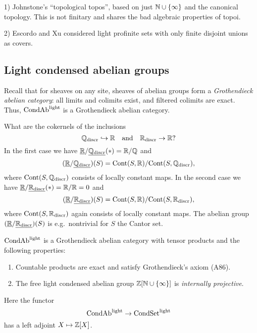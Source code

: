 \documentclass{notes}
\begin{document}
\begin{rem}
1) Johnstone's ``topological topos'', based on just ${\mathbb{N}}\cup\{\infty\}$
and the canonical topology. This is not finitary and shares the bad
algebraic properties of topoi. 

2) Escordo and Xu considered light profinite sets with only finite
disjoint unions as covers. 
\end{rem}

\subsection{Light condensed abelian groups}

Recall that for sheaves on any site, sheaves of abelian groups form a
{\em Grothendieck abelian category}: all limits and colimits exist,
and filtered colimits are exact. 
Thus, $\text{CondAb}^{\rm light}$ is a Grothendieck abelian category. 

\begin{example}
What are the cokernels of the inclusions
$$
  {\mathbb{Q}}_{\rm discr}\hookrightarrow{\mathbb{R}} \quad\text{and}\quad {\mathbb{R}}_{\rm discr}\to {\mathbb{R}}?
$$
In the first case we have $\underline{{\mathbb{R}}}/\underline{{\mathbb{Q}}_{\rm discr}}(*)={\mathbb{R}}/{\mathbb{Q}}$ and 
$$
  (\underline{{\mathbb{R}}}/\underline{{\mathbb{Q}}_{\rm discr}})(S) = {\rm Cont}(S,{\mathbb{R}})/{\rm Cont}(S,{\mathbb{Q}}_{\rm discr}),
$$
where ${\rm Cont}(S,{\mathbb{Q}}_{\rm discr})$ consists of locally constant maps.
In the second case we have $\underline{{\mathbb{R}}}/\underline{{\mathbb{R}}_{\rm discr}}(*)={\mathbb{R}}/{\mathbb{R}}=0$ and 
$$
  (\underline{{\mathbb{R}}}/\underline{{\mathbb{R}}_{\rm discr}})(S) = {\rm Cont}(S,{\mathbb{R}})/{\rm Cont}(S,{\mathbb{R}}_{\rm discr}),
$$
where ${\rm Cont}(S,{\mathbb{R}}_{\rm discr})$ again consists of locally constant maps.
The abelian group $(\underline{{\mathbb{R}}}/\underline{{\mathbb{R}}_{\rm discr}})(S)$ is e.g.~nontrivial for
$S$ the Cantor set.
\end{example}

\begin{thm}
$\text{CondAb}^{\rm light}$ is a Grothendieck abelian category with
  tensor products and the following properties:
\begin{enumerate}
\item Countable products are exact and satisfy Grothendieck's axiom
  (A86).
\item The free light condensed abelian group ${\mathbb{Z}}[{\mathbb{N}}\cup\{\infty\}]$ is
  {\em internally projective}. 
\end{enumerate}
\end{thm}

Here the functor 
$$
  \text{CondAb}^{\rm light} \to \text{CondSet}^{\rm light}
$$
has a left adjoint $X\mapsto {\mathbb{Z}}[X]$. 
  

\newpage

\end{document}
